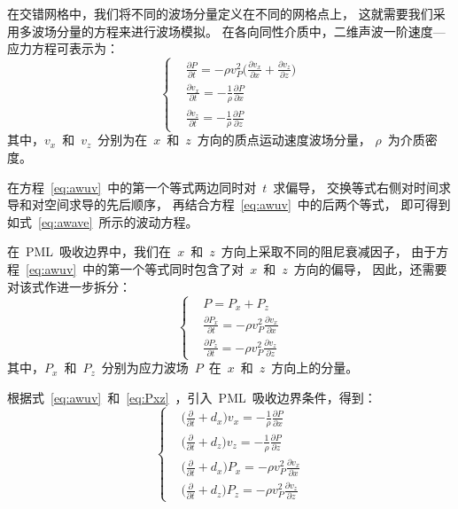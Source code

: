 \documentclass[UTF8]{ctexart}
\begin{document}
在交错网格中，我们将不同的波场分量定义在不同的网格点上，
这就需要我们采用多波场分量的方程来进行波场模拟。
在各向同性介质中，二维声波一阶速度—应力方程可表示为：
\begin{equation}\label{eq:awuv}
\left\{ \begin{aligned}
& \frac{\partial P}{\partial t}=-\rho v_P^2 \big(\frac{\partial v_x}{\partial x}+\frac{\partial v_z}{\partial z} \big) \\
& \frac{\partial v_x}{\partial t}=-\frac{1}{\rho} \frac{\partial P}{\partial x} \\
& \frac{\partial v_z}{\partial t}=-\frac{1}{\rho} \frac{\partial P}{\partial z}
\end{aligned} \right.
\end{equation}
其中，$v_x$~和~$v_z$~分别为在~$x$~和~$z$~方向的质点运动速度波场分量，
$\rho$~为介质密度。

在方程~\eqref{eq:awuv}~中的第一个等式两边同时对~$t$~求偏导，
交换等式右侧对时间求导和对空间求导的先后顺序，
再结合方程~\eqref{eq:awuv}~中的后两个等式，
即可得到如式~\eqref{eq:awave}~所示的波动方程。

在~PML~吸收边界中，我们在~$x$~和~$z$~方向上采取不同的阻尼衰减因子，
由于方程~\eqref{eq:awuv}~中的第一个等式同时包含了对~$x$~和~$z$~方向的偏导，
因此，还需要对该式作进一步拆分：
\begin{equation}\label{eq:Pxz}
\left\{ \begin{aligned}
& P=P_x+P_z \\
& \frac{\partial P_x}{\partial t}=-\rho v_P^2 \frac{\partial v_x}{\partial x} \\
& \frac{\partial P_z}{\partial t}=-\rho v_P^2 \frac{\partial v_z}{\partial z}
\end{aligned} \right.
\end{equation}
其中，$P_x$~和~$P_z$~分别为应力波场~$P$~在~$x$~和~$z$~方向上的分量。

根据式~\eqref{eq:awuv}~和~\eqref{eq:Pxz}~，引入~PML~吸收边界条件，得到：
\begin{equation}
\left\{ \begin{aligned}
& \big(\frac{\partial}{\partial t}+d_x\big)v_x=-\frac{1}{\rho}\frac{\partial P}{\partial x} \\
& \big(\frac{\partial}{\partial t}+d_z\big)v_z=-\frac{1}{\rho}\frac{\partial P}{\partial z} \\
& \big(\frac{\partial}{\partial t}+d_x\big)P_x=-\rho v_P^2\frac{\partial v_x}{\partial x} \\
& \big(\frac{\partial}{\partial t}+d_z\big)P_z=-\rho v_P^2\frac{\partial v_z}{\partial z}
\end{aligned} \right.
\end{equation}
\end{document}
